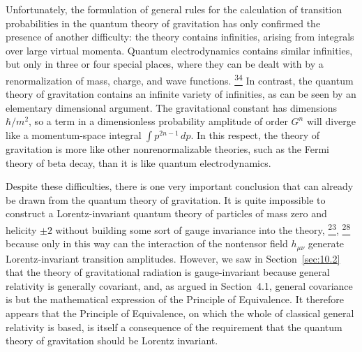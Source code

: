 Unfortunately, the formulation of general rules for the calculation of
transition probabilities in the quantum theory of gravitation has only
confirmed the presence of another difficulty: the theory contains infinities,
arising from integrals over large virtual momenta. Quantum electrodynamics
contains similar infinities, but only in three or four special places, where
they can be dealt with by a renormalization of mass, charge, and wave
functions.%
\hyperref[ch10-ref-34]{\textsuperscript{34}}
In contrast, the quantum theory of gravitation contains an infinite variety of
infinities, as can be seen by an elementary dimensional argument. The
gravitational constant has dimensions \(\hbar/m^2\), so a term in a
dimensionless probability amplitude of order \(G^n\) will diverge like a
momentum-space integral \(\int p^{2n-1}\,dp\). In this respect, the theory
of gravitation is more like other nonrenormalizable theories, such as the
Fermi theory of beta decay, than it is like quantum electrodynamics.

Despite these difficulties, there is one very important conclusion that can
already be drawn from the quantum theory of gravitation. It is quite
impossible to construct a Lorentz-invariant quantum theory of particles of
mass zero and helicity \(\pm2\) without building some sort of gauge invariance
into the theory,%
\hyperref[ch10-ref-23]{\textsuperscript{23}},%
\hyperref[ch10-ref-28]{\textsuperscript{28}}
because only in this way can the interaction of the nontensor field
\(h_{\mu\nu}\) generate Lorentz-invariant transition amplitudes. However, we
saw in Section~\ref{sec:10.2} that the theory of gravitational radiation is
gauge-invariant because general relativity is generally covariant, and, as
argued in Section~4.1, general covariance is but the mathematical expression
of the Principle of Equivalence. It therefore appears that the Principle of
Equivalence, on which the whole of classical general relativity is based, is
itself a consequence of the requirement that the quantum theory of gravitation
should be Lorentz invariant.
